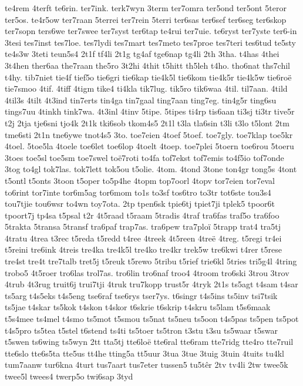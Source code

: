 te4rem
4terft
te6rin.
ter7ink.
terk7wyn
3term
ter7omra
ter5ond
ter5ont
5teror
ter5os.
te4r5ow
ter7raan
5terrei
ter7rein
5terri
ter6sas
ter6sef
ter6seg
ter6skop
ter7sopn
ters6we
ter7swee
ter7syst
ter6tap
te4rui
ter7uie.
te6ryst
ter7yste
ter6-in
3tesi
tes7inst
tes7loe.
tes7lydi
tes7mart
tes7meto
tes7proe
tes7teri
tes6tud
te5sty
te4s3w
3teti
teun5s4
2t1f
tf4li
2t1g
tg4af
tge6nap
tg4li
2th
3tha.
t4has
4thei
3t4hen
ther6aa
the7raan
the5ro
3t2hi
4thit
t5hitt
th5leh
t4ho.
tho6nat
ths7chil
t4hy.
tib7niet
tie4f
tief5o
tie6gri
tie6kap
tie4k5l
tie6kom
tie4k5r
tie4k5w
tie6roë
tie7smoo
4tif.
4tiff
4tigm
tike4
ti4kla
tik7lug.
tik5ro
tik6waa
4til.
til7aan.
4tild
4til3s
4tilt
4t3ind
tin7erts
tin4ga
tin7gaal
ting7aan
ting7eg.
tin4g5r
ting6su
tings7uu
4tinkh
tink7wa.
4t3inl
4tinv
5tipe.
5tipes
ti4rp
tis6aan
ti3sj
ti3tr
tive5r
t2j
2tja
tje6sni
tjo4k
2t1k
tki6sob
tkom4s5
2t1l
t3la
tla6sin
t3li
t3lo
t5lont
2tm
tme6sti
2t1n
tne6ywe
tnot4s5
3to.
toe7eien
4toef
5toef.
toe7gly.
toe7klap
toe5kr
4toel.
5toe5la
4toele
toe6let
toe6lop
4toelt
4toep.
toe7plei
5toern
toe6rou
5toeru
3toes
toe5sl
toe5sm
toe7swel
toë7roti
to4fa
tof7ekst
tof7emis
to4f5io
tof7onde
3tog
to4gl
tok7las.
tok7lett
tok5ou
t5olie.
4tom.
4tond
3tone
ton4gr
tong5s
4tont
t5ontl
t5onts
3toon
t5oper
to5p4he
4topm
top7oorl
4topv
tor7eien
tor7eval
to6rint
tor7inte
tor6m5ag
tor6mom
to1s
to3sf
tos6tro
to3tr
tot6ste
tou3s4
tou7tjie
tou6wsr
to4wn
toy7ota.
2tp
tpen6sk
tpie6tj
tpiet7ji
tplek5
tpoor6t
tpoort7j
tp4sa
t5psal
t2r
4t5raad
t5raam
5tradis
4traf
tra6fas
traf5o
tra6foo
5trakta
5transa
5transf
tra6paf
trap7as.
tra6pew
tra7ploï
5trapp
trat4
tra5tj
4tratu
4trea
t3rec
t5reda
t5redd
t4ree
4treek
4t5reen
4treë
4treg.
t5regi
tr4ei
t5reini
tre6ink
4treis
tre4ka
tre4k5l
tre4ko
tre4kr
trek5w
tre6kwi
t4rer
t5rese
tre4st
tre4t
tre7talb
tret5j
t5reuk
t5rewo
5tribu
t5rief
trie6kl
5tries
tri5g4l
4tring
trobo5
4t5roer
tro6las
trol7as.
tro6lin
tro6naf
troo4
4troom
tro6ski
3trou
3trov
4trub
4t3rug
truit6j
trui7tji
4truk
tru7kopp
trust5r
4tryk
2t1s
ts5agt
t4sam
t4sar
ts5arg
t4s5eks
t4s5eng
tse6raf
tse6rys
tser7ys.
t6singr
t4s5ins
ts5inv
tsi7tsik
ts5jae
t4skar
ts5kok
t4skon
t4skor
t6skrie
t6skrip
t4skru
ts5lam
t5s6maak
t5s4mee
ts4mel
t4smo
ts5mot
t5smou
ts5nat
ts5neu
ts5oon
t4s5pas
ts5pen
ts5pot
t4s5pro
ts5tea
t5stel
t6stend
ts4ti
ts5toer
ts5tron
t3stu
t3su
ts5waar
t5swar
t5swen
ts6wing
ts5wyn
2tt
tta5tj
tte6loë
tte6ral
tte6ram
tte7ridg
tte4ro
tte7ruil
tte6slo
tte6s5ta
tte5us
tt4he
tting5a
tt5uur
3tua
3tue
3tuig
3tuin
4tuits
tu4kl
tum7aanw
tur6kna
4turt
tus7aart
tus7eter
tussen5
tu5têr
2tv
tv4li
2tw
twee5k
twee5l
twees4
twerp5o
twi6sap
3tyd
